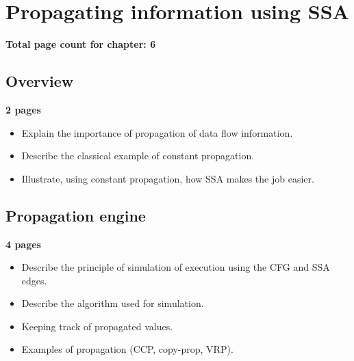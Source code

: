 \applynumberofpages\chapter{Propagating information using SSA}

\textbf{Total page count for chapter: 6}

\section{Overview}

\textbf{2 pages}

\begin{itemize}
\item	Explain the importance of propagation of data flow
	information.

\item	Describe the classical example of constant propagation.

\item	Illustrate, using constant propagation, how SSA makes
	the job easier.
\end{itemize}


\section{Propagation engine}

\textbf{4 pages}

\begin{itemize}
\item	Describe the principle of simulation of execution using
	the CFG and SSA edges.

\item	Describe the algorithm used for simulation.

\item	Keeping track of propagated values.

\item	Examples of propagation (CCP, copy-prop, VRP).
\end{itemize}

